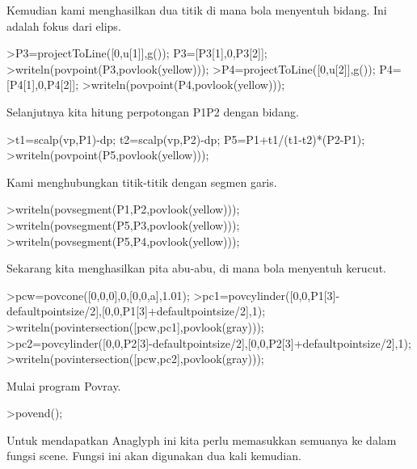\documentclass{article}
\begin{document}
\begin{eulernotebook}
\begin{eulercomment}
\begin{eulercomment}
\begin{eulercomment}
\begin{eulercomment}
\begin{eulercomment}
Kemudian kami menghasilkan dua titik di mana bola menyentuh bidang.
Ini adalah fokus dari elips.
\end{eulercomment}
\begin{eulerprompt}
>P3=projectToLine([0,u[1]],g()); P3=[P3[1],0,P3[2]];
>writeln(povpoint(P3,povlook(yellow)));
>P4=projectToLine([0,u[2]],g()); P4=[P4[1],0,P4[2]];
>writeln(povpoint(P4,povlook(yellow)));
\end{eulerprompt}
\begin{eulercomment}
Selanjutnya kita hitung perpotongan P1P2 dengan bidang.
\end{eulercomment}
\begin{eulerprompt}
>t1=scalp(vp,P1)-dp; t2=scalp(vp,P2)-dp; P5=P1+t1/(t1-t2)*(P2-P1);
>writeln(povpoint(P5,povlook(yellow)));
\end{eulerprompt}
\begin{eulercomment}
Kami menghubungkan titik-titik dengan segmen garis.
\end{eulercomment}
\begin{eulerprompt}
>writeln(povsegment(P1,P2,povlook(yellow)));
>writeln(povsegment(P5,P3,povlook(yellow)));
>writeln(povsegment(P5,P4,povlook(yellow)));
\end{eulerprompt}
\begin{eulercomment}
Sekarang kita menghasilkan pita abu-abu, di mana bola menyentuh
kerucut.
\end{eulercomment}
\begin{eulerprompt}
>pcw=povcone([0,0,0],0,[0,0,a],1.01);
>pc1=povcylinder([0,0,P1[3]-defaultpointsize/2],[0,0,P1[3]+defaultpointsize/2],1);
>writeln(povintersection([pcw,pc1],povlook(gray)));
>pc2=povcylinder([0,0,P2[3]-defaultpointsize/2],[0,0,P2[3]+defaultpointsize/2],1);
>writeln(povintersection([pcw,pc2],povlook(gray)));
\end{eulerprompt}
\begin{eulercomment}
Mulai program Povray.
\end{eulercomment}
\begin{eulerprompt}
>povend();
\end{eulerprompt}
\begin{eulercomment}
Untuk mendapatkan Anaglyph ini kita perlu memasukkan semuanya ke dalam
fungsi scene. Fungsi ini akan digunakan dua kali kemudian.
\end{eulercomment}
\begin{eulerprompt}

\end{eulerprompt}
\end{eulercomment}
\end{eulercomment}
\end{eulercomment}
\end{eulercomment}
\end{eulernotebook}
\end{document}
